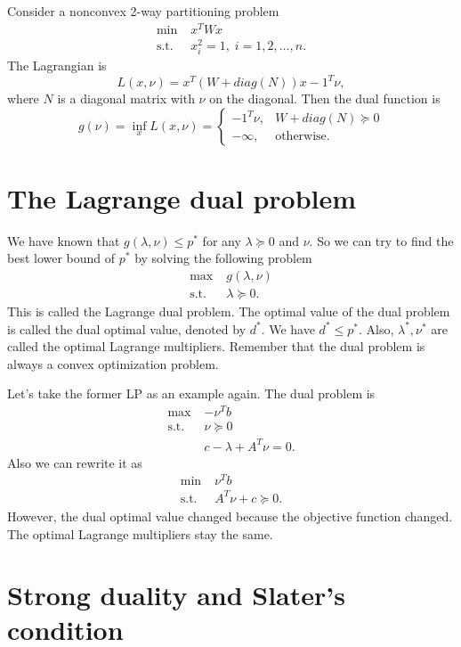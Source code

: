 \documentclass[lang=en,color=blue,mode=fancy,titlestyle=hang]{elegantbook}
\begin{document}
Consider a nonconvex 2-way partitioning problem
\begin{align*}
\min \; &x^T W x\\
\text{s.t.} \; &x_i^2 = 1, \; i = 1, 2, \ldots, n.
\end{align*}
The Lagrangian is
\[
L(x, \nu) =  x^T (W + diag(N)) x - 1^T \nu,
\]
where $N$ is a diagonal matrix with $\nu$ on the diagonal. Then the dual function is
\[
g(\nu) = \inf_{x} L(x, \nu) =
\begin{cases}
- 1^T \nu, & W + diag(N) \succeq 0\\
- \infty, & \text{otherwise}.
\end{cases}
\]

\section{The Lagrange dual problem}

We have known that $g(\lambda, \nu) \leq p^*$ for any $\lambda \succeq 0$ and $\nu$.
So we can try to find the best lower bound of $p^*$ by solving the following problem
\begin{align*}
\max \; &g(\lambda, \nu)\\
\text{s.t.} \; &\lambda \succeq 0.
\end{align*}
This is called the Lagrange dual problem. The optimal value of the dual problem is called
the dual optimal value, denoted by $d^*$. We have $d^* \leq p^*$. Also, $\lambda^*, \nu^*$
are called the optimal Lagrange multipliers. Remember that the dual problem is always a
convex optimization problem.

Let's take the former LP as an example again. The dual problem is
\begin{align*}
\max \; &- \nu^T b\\
\text{s.t.} \; &\nu \succeq 0\\
&c - \lambda + A^T \nu = 0.
\end{align*}
Also we can rewrite it as
\begin{align*}
\min \; & \nu^T b\\
\text{s.t.} \; &A^T \nu + c\succeq 0.
\end{align*}
However, the dual optimal value changed because the objective function changed. The optimal
Lagrange multipliers stay the same.

\section{Strong duality and Slater's condition}
\end{document}
